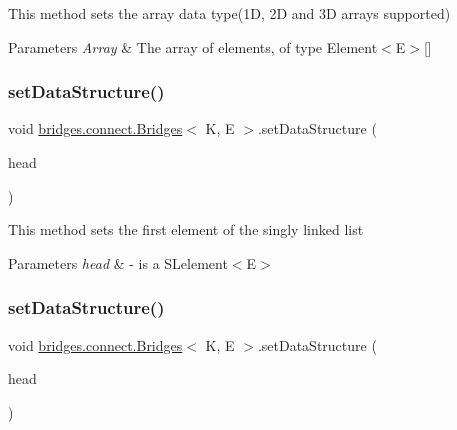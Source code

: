 This method sets the array data type(1\+D, 2\+D and 3\+D arrays supported)


\begin{DoxyParams}{Parameters}
{\em Array} & The array of elements, of type Element$<$\+E$>$\mbox{[}\mbox{]} \\
\hline
\end{DoxyParams}
\hypertarget{classbridges_1_1connect_1_1_bridges_ae41b3d86963350ace304d8951c1863ad}{}\label{classbridges_1_1connect_1_1_bridges_ae41b3d86963350ace304d8951c1863ad} 
\subsubsection{\texorpdfstring{set\+Data\+Structure()}{setDataStructure()}\hspace{0.1cm}{\footnotesize\ttfamily [3/12]}}
{\footnotesize\ttfamily void \hyperlink{classbridges_1_1connect_1_1_bridges}{bridges.\+connect.\+Bridges}$<$ K, E $>$.set\+Data\+Structure (\begin{DoxyParamCaption}\item[{\hyperlink{classbridges_1_1base_1_1_s_lelement}{S\+Lelement}$<$ E $>$}]{head }\end{DoxyParamCaption})}

This method sets the first element of the singly linked list 
\begin{DoxyParams}{Parameters}
{\em head} & -\/ is a S\+Lelement$<$\+E$>$ \\
\hline
\end{DoxyParams}
\hypertarget{classbridges_1_1connect_1_1_bridges_a383877f85bb048d47560e76f359e1bda}{}\label{classbridges_1_1connect_1_1_bridges_a383877f85bb048d47560e76f359e1bda} 
\subsubsection{\texorpdfstring{set\+Data\+Structure()}{setDataStructure()}\hspace{0.1cm}{\footnotesize\ttfamily [4/12]}}
{\footnotesize\ttfamily void \hyperlink{classbridges_1_1connect_1_1_bridges}{bridges.\+connect.\+Bridges}$<$ K, E $>$.set\+Data\+Structure (\begin{DoxyParamCaption}\item[{\hyperlink{classbridges_1_1base_1_1_d_lelement}{D\+Lelement}$<$ E $>$}]{head }\end{DoxyParamCaption})}

